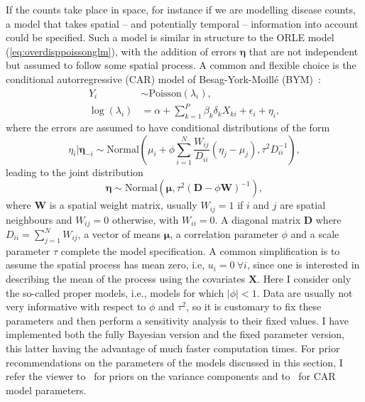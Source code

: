 If the counts take place in space, for instance if we are modelling disease counts, a model that takes spatial -- and potentially temporal -- information into account could be specified.
Such a model is similar in structure to the ORLE model (\ref{eq:overdisppoissonglm}), with the addition of errors $\boldsymbol\eta$  that are not independent but assumed to follow some spatial process.
A common and flexible choice is the conditional autorregressive (CAR) model of Besag-York-Moill\'e (BYM)~\citep{Besag1991}:
\begin{align}
 \label{eq:bym}
   Y_i &\sim \text{Poisson}(\lambda_i), \\
  \log(\lambda_i) &= \alpha + \sum_{k=1}^P \beta_k\delta_k X_{ki} + \epsilon_i + \eta_i,
\end{align}
where the errors are assumed to have conditional distributions of the form
\begin{equation}
 \eta_i | \boldsymbol\eta_{-i} \sim \text{Normal}\left(\mu_i + \phi\sum_{i=1}^N\frac{W_{ij}}{D_{ii}}\left( \eta_j-\mu_j \right), \tau^2 D_{ii}^{-1} \right), 
\end{equation}
leading to the joint distribution
\begin{equation}
 \boldsymbol\eta \sim \text{Normal}\left(\boldsymbol\mu,  \tau^2 \left( \boldsymbol D - \phi \boldsymbol W \right)^{-1} \right),
\end{equation}
where $\boldsymbol W$ is a spatial weight matrix, usually $W_{ij} = 1$ if $i$ and $j$ are spatial neighbours and $W_{ij} = 0$ otherwise, with $W_{ii} = 0$.
A diagonal matrix $\boldsymbol D$ where $D_{ii} = \sum_{j = 1}^N W_{ij}$, a vector of means $\boldsymbol\mu$, a correlation parameter $\phi$ and a scale parameter $\tau$ complete the model specification.
A common simplification is to assume the spatial process has mean zero, i.e, $u_i = 0 \:\forall i$, since one is interested in describing the mean of the process using the covariates $\boldsymbol X$.
Here I consider only the so-called proper models, i.e., models for which  $|\phi| < 1$.
Data are usually not very informative with respect to $\phi$ and $\tau^2$, so it is customary to fix these parameters and then perform a sensitivity analysis to their fixed values.
I have implemented both the fully Bayesian version and the fixed parameter version, this latter having the advantage of much faster computation times.
For prior recommendations on the parameters of the models discussed in this section, I refer the viewer to~\cite{Gelman2006} for priors on the variance components and to~\cite[sec. 5.4.3]{Banerjee2003} for CAR model parameters.


